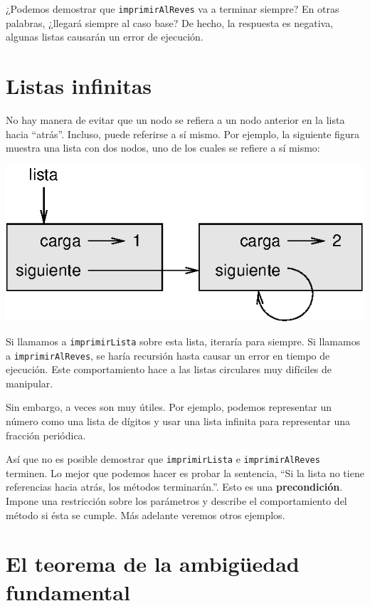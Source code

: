 ¿Podemos demostrar que \texttt{imprimirAlReves} va a terminar siempre?
En otras palabras, ¿llegará siempre al caso base? De hecho, la respuesta
es negativa, algunas listas causarán un error de ejecución.

\section{Listas infinitas }

  

No hay manera de evitar que un nodo se refiera a un nodo anterior
en la lista hacia ``atrás''. Incluso, puede referirse a sí mismo.
Por ejemplo, la siguiente figura muestra una lista con dos nodos,
uno de los cuales se refiere a sí mismo:

\beforefig \centerline{\includegraphics{illustrations/link4}}
\afterfig

Si llamamos a \texttt{imprimirLista} sobre esta lista, iteraría para
siempre. Si llamamos a \texttt{imprimirAlReves}, se haría recursión
hasta causar un error en tiempo de ejecución. Este comportamiento
hace a las listas circulares muy difíciles de manipular.

Sin embargo, a veces son muy útiles. Por ejemplo, podemos representar
un número como una lista de dígitos y usar una lista infinita para
representar una fracción periódica.

Así que no es posible demostrar que \texttt{imprimirLista} e \texttt{imprimirAlReves}
terminen. Lo mejor que podemos hacer es probar la sentencia, ``Si
la lista no tiene referencias hacia atrás, los métodos terminarán.''.
Esto es una \textbf{precondición}. Impone una restricción sobre los
parámetros y describe el comportamiento del método si ésta se cumple.
Más adelante veremos otros ejemplos.


\section{El teorema de la ambigüedad fundamental}

